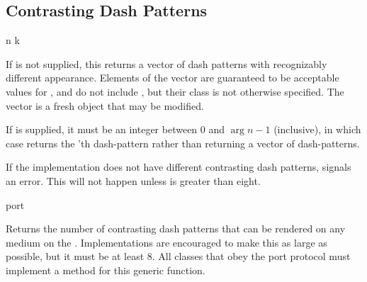 \subsection {Contrasting Dash Patterns}

 {n \optional k}

If  is not supplied, this returns a vector of  dash patterns with
recognizably different appearance.  Elements of the vector are guaranteed to be
acceptable values for , and do not include , but their class
is not otherwise specified.  The vector is a fresh object that may be modified.

If  is supplied, it must be an integer between 0 and $\arg{n}-1$
(inclusive), in which case  returns the
'th dash-pattern rather than returning a vector of dash-patterns.

If the implementation does not have  different contrasting dash patterns,
 signals an error.  This will not happen
unless  is greater than eight.

 {port}

Returns the number of contrasting dash patterns that can be rendered on any
medium on the  .  Implementations are encouraged to make
this as large as possible, but it must be at least 8.  All classes that obey the
port protocol must implement a method for this generic function.
